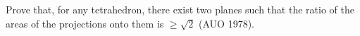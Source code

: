 Prove that, for any tetrahedron, there exist two planes such that the ratio of the areas of the projections onto them is $\geq \sqrt{2}$ (AUO 1978).

